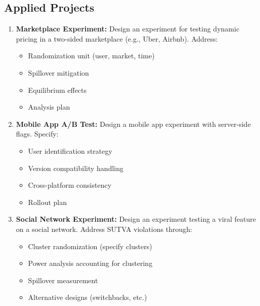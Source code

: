 \subsection{Applied Projects}

\begin{enumerate}
    \item \textbf{Marketplace Experiment:} Design an experiment for testing dynamic pricing in a two-sided marketplace (e.g., Uber, Airbnb). Address:
    \begin{itemize}
        \item Randomization unit (user, market, time)
        \item Spillover mitigation
        \item Equilibrium effects
        \item Analysis plan
    \end{itemize}

    \item \textbf{Mobile App A/B Test:} Design a mobile app experiment with server-side flags. Specify:
    \begin{itemize}
        \item User identification strategy
        \item Version compatibility handling
        \item Cross-platform consistency
        \item Rollout plan
    \end{itemize}

    \item \textbf{Social Network Experiment:} Design an experiment testing a viral feature on a social network. Address SUTVA violations through:
    \begin{itemize}
        \item Cluster randomization (specify clusters)
        \item Power analysis accounting for clustering
        \item Spillover measurement
        \item Alternative designs (switchbacks, etc.)
    \end{itemize}
\end{enumerate}

